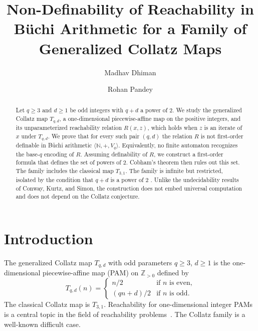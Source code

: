 \documentclass[runningheads]{llncs}
\begin{document}
\title{Non-Definability of Reachability in B\"uchi Arithmetic for a Family of Generalized Collatz Maps}

\author{Madhav Dhiman \and Rohan Pandey}


\maketitle

\begin{abstract}
Let $q \ge 3$ and $d \ge 1$ be odd integers with $q+d$ a power of $2$.
We study the generalized Collatz map $T_{q,d}$, a one-dimensional
piecewise-affine map on the positive integers, and its unparameterized
reachability relation $R(x,z)$, which holds when $z$ is an iterate of
$x$ under $T_{q,d}$. We prove that for every such pair $(q,d)$ the
relation $R$ is not first-order definable in B\"uchi arithmetic
$\langle \mathbb{N}, +, V_q \rangle$. Equivalently, no finite automaton
recognizes the base-$q$ encoding of $R$. Assuming definability of $R$,
we construct a first-order formula that defines the set of powers of
$2$. Cobham's theorem then rules out this set. The family includes the
classical map $T_{3,1}$. The family is infinite but restricted, isolated by the condition that $q+d$ is a power of $2$ . Unlike the undecidability results
of Conway, Kurtz, and Simon, the construction does not embed universal
computation and does not depend on the Collatz conjecture.
\end{abstract}

\section{Introduction}

The generalized Collatz map $T_{q,d}$ with odd parameters $q \ge 3$,
$d \ge 1$ is the one-dimensional piecewise-affine map (PAM) on
$\mathbb{Z}_{>0}$ defined by
\[
T_{q,d}(n) = \begin{cases} n/2 & \text{if } n \text{ is even,} \\
(qn+d)/2 & \text{if } n \text{ is odd.} \end{cases}
\]
The classical Collatz map is $T_{3,1}$. Reachability for
one-dimensional integer PAMs is a central topic in the field of
reachability problems~\cite{BenAmram,Blondel}. The Collatz family is a
well-known difficult case.
\end{document}
